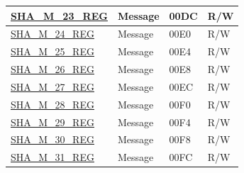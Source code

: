 \begin{longtable}{ | p{6cm} | p{7.2cm} | p{1.3cm} | p{1cm} | }
\hyperref[regdesc:SHAMNREG]{SHA\_M\_23\_REG} & Message & \hexprefix{}00DC & R/W \\ \hline
\hyperref[regdesc:SHAMNREG]{SHA\_M\_24\_REG} & Message & \hexprefix{}00E0 & R/W \\ \hline
\hyperref[regdesc:SHAMNREG]{SHA\_M\_25\_REG} & Message & \hexprefix{}00E4 & R/W \\ \hline
\hyperref[regdesc:SHAMNREG]{SHA\_M\_26\_REG} & Message & \hexprefix{}00E8 & R/W \\ \hline
\hyperref[regdesc:SHAMNREG]{SHA\_M\_27\_REG} & Message & \hexprefix{}00EC & R/W \\ \hline
\hyperref[regdesc:SHAMNREG]{SHA\_M\_28\_REG} & Message & \hexprefix{}00F0 & R/W \\ \hline
\hyperref[regdesc:SHAMNREG]{SHA\_M\_29\_REG} & Message & \hexprefix{}00F4 & R/W \\ \hline
\hyperref[regdesc:SHAMNREG]{SHA\_M\_30\_REG} & Message & \hexprefix{}00F8 & R/W \\ \hline
\hyperref[regdesc:SHAMNREG]{SHA\_M\_31\_REG} & Message & \hexprefix{}00FC & R/W \\ \hline
\end{longtable}
